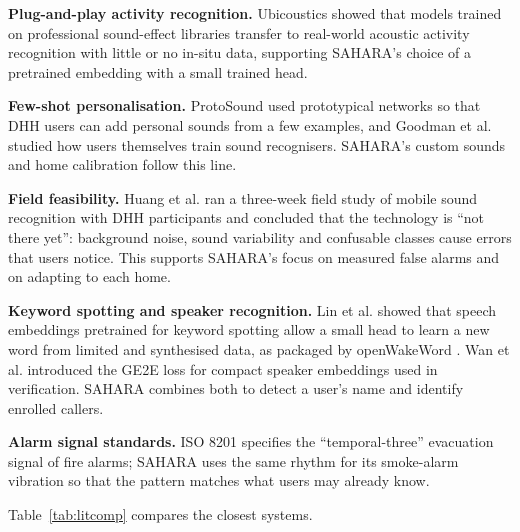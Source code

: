 \documentclass[12pt,a4paper,oneside]{report}
\begin{document}
\textbf{Plug-and-play activity recognition.} Ubicoustics \cite{laput2018} showed that models trained on professional sound-effect libraries transfer to real-world acoustic activity recognition with little or no in-situ data, supporting SAHARA's choice of a pretrained embedding with a small trained head.

\textbf{Few-shot personalisation.} ProtoSound \cite{jain2022protosound} used prototypical networks \cite{snell2017} so that DHH users can add personal sounds from a few examples, and Goodman et al. \cite{goodman2021} studied how users themselves train sound recognisers. SAHARA's custom sounds and home calibration follow this line.

\textbf{Field feasibility.} Huang et al. \cite{huang2023} ran a three-week field study of mobile sound recognition with DHH participants and concluded that the technology is ``not there yet'': background noise, sound variability and confusable classes cause errors that users notice. This supports SAHARA's focus on measured false alarms and on adapting to each home.

\textbf{Keyword spotting and speaker recognition.} Lin et al. \cite{lin2020} showed that speech embeddings pretrained for keyword spotting allow a small head to learn a new word from limited and synthesised data, as packaged by openWakeWord \cite{openwakeword}. Wan et al. \cite{wan2018} introduced the GE2E loss for compact speaker embeddings used in verification. SAHARA combines both to detect a user's name and identify enrolled callers.

\textbf{Alarm signal standards.} ISO 8201 \cite{iso8201} specifies the ``temporal-three'' evacuation signal of fire alarms; SAHARA uses the same rhythm for its smoke-alarm vibration so that the pattern matches what users may already know.

Table~\ref{tab:litcomp} compares the closest systems.
\end{document}
